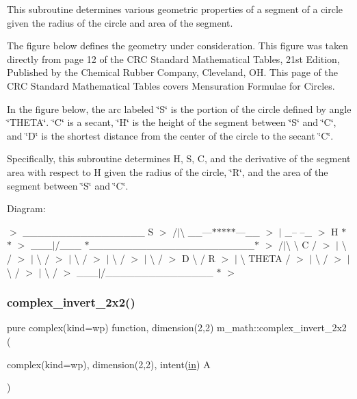 This subroutine determines various geometric properties of a segment of a circle given the radius of the circle and area of the segment.

The figure below defines the geometry under consideration. This figure was taken directly from page 12 of the C\+RC Standard Mathematical Tables, 21st Edition, Published by the Chemical Rubber Company, Cleveland, OH. This page of the C\+RC Standard Mathematical Tables covers Mensuration Formulae for Circles.

In the figure below, the arc labeled \char`\"{}\+S\char`\"{} is the portion of the circle defined by angle \char`\"{}\+T\+H\+E\+T\+A\char`\"{}. \char`\"{}\+C\char`\"{} is a secant, \char`\"{}\+H\char`\"{} is the height of the segment between \char`\"{}\+S\char`\"{} and \char`\"{}\+C\char`\"{}, and \char`\"{}\+D\char`\"{} is the shortest distance from the center of the circle to the secant \char`\"{}\+C\char`\"{}.

Specifically, this subroutine determines H, S, C, and the derivative of the segment area with respect to H given the radius of the circle, \char`\"{}\+R\char`\"{}, and the area of the segment between \char`\"{}\+S\char`\"{} and \char`\"{}\+C\char`\"{}.

Diagram\+:

$>$ \+\_\+\+\_\+\+\_\+\+\_\+\+\_\+\+\_\+\+\_\+\+\_\+\+\_\+\+\_\+\+\_\+\+\_\+\+\_\+\+\_\+\+\_\+\+\_\+\+\_\+ S $>$ /$\vert$\textbackslash{} \+\_\+\+\_\+---$\ast$$\ast$$\ast$$\ast$$\ast$---\+\_\+\+\_\+ $>$ $\vert$ \+\_\+-- --\+\_\+ $>$ H $\ast$ $\ast$ $>$ \+\_\+\+\_\+\+\_\+$|$/\+\_\+\+\_\+\+\_\+ $\ast$\+\_\+\+\_\+\+\_\+\+\_\+\+\_\+\+\_\+\+\_\+\+\_\+\+\_\+\+\_\+\+\_\+\+\_\+\+\_\+\+\_\+\+\_\+\+\_\+\+\_\+\+\_\+\+\_\+\+\_\+\+\_\+\+\_\+\+\_\+$\ast$ $>$ /$\vert$\textbackslash{} \textbackslash{} C / $>$ $\vert$ \textbackslash{} / $>$ $\vert$ \textbackslash{} / $>$ $\vert$ \textbackslash{} / $>$ $\vert$ \textbackslash{} / $>$ $\vert$ \textbackslash{} / $>$ D \textbackslash{} / R $>$ $\vert$ \textbackslash{} T\+H\+E\+TA / $>$ $\vert$ \textbackslash{} / $>$ $\vert$ \textbackslash{} / $>$ $\vert$ \textbackslash{} / $>$ \+\_\+\+\_\+\+\_\+$|$/\+\_\+\+\_\+\+\_\+\+\_\+\+\_\+\+\_\+\+\_\+\+\_\+\+\_\+\+\_\+\+\_\+\+\_\+\+\_\+\+\_\+\+\_\+ $\ast$ $>$ \mbox{\label{namespacem__math_ae91471830acbe021ac273b72331bafd2}} 
\subsubsection{\texorpdfstring{complex\+\_\+invert\+\_\+2x2()}{complex\_invert\_2x2()}}
{\footnotesize\ttfamily pure complex(kind=wp) function, dimension(2,2) m\+\_\+math\+::complex\+\_\+invert\+\_\+2x2 (\begin{DoxyParamCaption}\item[{complex(kind=wp), dimension(2,2), intent(\hyperlink{M__journal_83_8txt_afce72651d1eed785a2132bee863b2f38}{in})}]{A }\end{DoxyParamCaption})\hspace{0.3cm}{\ttfamily [private]}}


